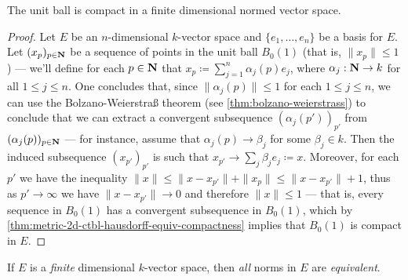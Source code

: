 \begin{corollary}
    \label{cor:unit-ball}
    The unit ball is compact in a finite dimensional normed vector space.
\end{corollary}

\begin{proof}
    Let \(E\) be an \(n\)-dimensional \(k\)-vector space and \(\{e_1, \dots, e_n\}\)
    be a basis for \(E\). Let \((x_p)_{p \in \mathbf{N}}\) be a sequence of points in the
    unit ball \(B_0(1)\) (that is, \(\| x_{p} \| \leq 1\)) --- we'll define for
    each \(p \in \mathbf{N}\) that \(x_p \coloneq \sum_{j=1}^{n} \alpha_j(p) e_j\), where
    \(\alpha_j: \mathbf{N} \to k\) for all \(1 \leq j \leq n\). One concludes that, since
    \(\| \alpha_j(p) \| \leq 1\) for each \(1 \leq j \leq n\), we can use the
    Bolzano-Weierstra{\ss} theorem (see \cref{thm:bolzano-weierstrass}) to conclude
    that we can extract a convergent subsequence \((\alpha_j(p'))_{p'}\) from
    \((\alpha_j(p))_{p \in \mathbf{N}}\) --- for instance, assume that \(\alpha_j(p) \to
    \beta_j\) for some \(\beta_j \in k\). Then the induced subsequence
    \((x_{p'})_{p'}\) is such that \(x_{p'} \to \sum_j \beta_j e_j \coloneq
    x\). Moreover, for each \(p'\) we have the inequality \(\| x \| \leq \| x -
    x_{p'} \| + \| x_{p} \| \leq \| x - x_{p'} \| + 1\), thus as \(p' \to \infty\)
    we have \(\| x - x_{p'} \| \to 0\) and therefore \(\| x \| \leq 1\) --- that
    is, every sequence in \(B_0(1)\) has a convergent subsequence in \(B_0(1)\),
    which by \cref{thm:metric-2d-ctbl-hausdorff-equiv-compactness} implies that
    \(B_0(1)\) is compact in \(E\).
\end{proof}

\begin{lemma}
    \label{lem:finite-dim-equivalent-norms}
    If \(E\) is a \emph{finite} dimensional \(k\)-vector space, then \emph{all}
    norms in \(E\) are \emph{equivalent}.
\end{lemma}

